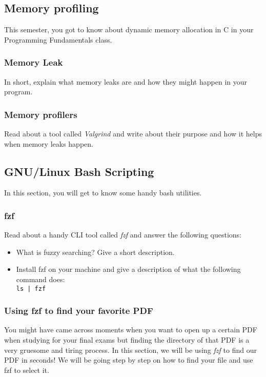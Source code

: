 \documentclass[12pt]{article}
\begin{document}
\subsection{Memory profiling}
This semester, you got to know about dynamic memory allocation in C in your Programming Fundamentals class.

\subsubsection{Memory Leak}
In short, explain what memory leaks are and how they might happen in your program.

\subsubsection{Memory profilers}
Read about a tool called \textit{Valgrind} and write about their purpose and how it helps when memory leaks happen.

\subsection{GNU/Linux Bash Scripting}
In this section, you will get to know some handy bash utilities.

\subsubsection{fzf}
Read about a handy CLI tool called \textit{fzf} and answer the following questions:

\begin{itemize}
    \item What is fuzzy searching? Give a short description.
    \item Install fzf on your machine and give a description of what the following command does:\\
        \texttt{ls | fzf}
\end{itemize}

\subsubsection{Using fzf to find your favorite PDF}
You might have came across moments when you want to open up a certain PDF when studying for your final exams but finding the directory of that
PDF is a very gruesome and tiring process. In this section, we will be using \textit{fzf} to find our PDF in seconds! We will be going step by step
on how to find your file and use fzf to select it.
\end{document}
